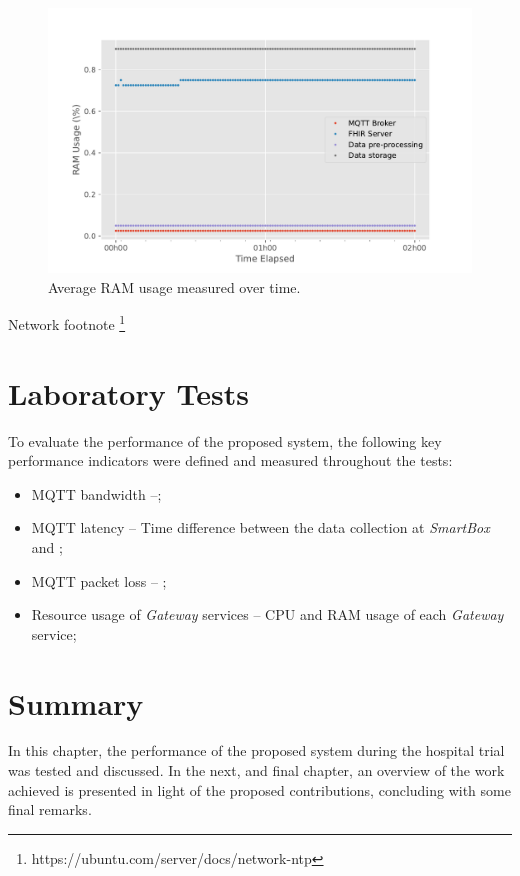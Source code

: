 \begin{figure}[H]
    \centering
    \includegraphics[width=0.66\linewidth]{images/PILOTram_usage.pdf}
    \caption{Average RAM usage measured over time.}
    \label{fig:pilot-ram-usage}
\end{figure}


Network footnote \footnote{https://ubuntu.com/server/docs/network-ntp}

\section{Laboratory Tests}

To evaluate the performance of the proposed system, the following key performance indicators were defined and measured throughout the tests:

\begin{itemize} 
    \item \acs{MQTT} bandwidth --;
    \item \acs{MQTT} latency -- Time difference between the data collection at \textit{SmartBox} and ;
    \item \acs{MQTT} packet loss -- ;
    \item Resource usage of \textit{Gateway} services -- CPU and RAM usage of each \textit{Gateway} service;
\end{itemize}



\section{Summary}
In this chapter, the performance of the proposed system during the hospital trial was tested and discussed. 
In the next, and final chapter, an overview of the work achieved is presented in light of the proposed contributions, concluding with some final remarks.